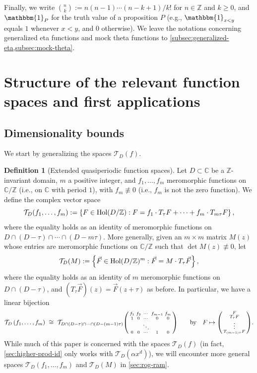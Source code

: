 \documentclass[reqno,11pt]{amsart}
\theoremstyle{definition}
\newtheorem{definition}[theorem]{Definition}
\theoremstyle{remark}
\numberwithin{equation}{section}
\newcommand{\Z}{\mathbb{Z}}
\newcommand{\C}{\mathbb{C}}
\newcommand{\mT}{\mathcal{T}}
\newcommand{\one}{\mathbbm{1}}
\newcommand{\Hol}{\textnormal{Hol}}
\newenvironment{psmall}
  {\left(\begin{smallmatrix}}
  {\end{smallmatrix}\right)}
\begin{document}
Finally, we write $\binom{n}{k} := n(n-1)\cdots(n-k+1)/k!$ for $n \in \Z$ and $k \ge 0$, and $\one_{P}$ for the truth value of a proposition $P$ (e.g., $\one_{x < y}$ equals $1$ whenever $x < y$, and $0$ otherwise). We leave the notations concerning generalized eta functions and mock theta functions to \cref{subsec:generalized-eta,subsec:mock-theta}.





\section{Structure of the relevant function spaces and first applications} \label{sec:preliminaries}

\subsection{Dimensionality bounds} \label{subsec:dim-bounds}
We start by generalizing the spaces $\mT_D(f)$.

\begin{definition}[Extended quasiperiodic function spaces] \label{def:T-spaces}
Let $D \subset \C$ be a $\Z$-invariant domain, $m$ a positive integer, and $f_1, \ldots, f_m$ meromorphic functions on $\C/\Z$ (i.e., on $\C$ with period $1$), with $f_m \not\equiv 0$ (i.e., $f_m$ is not the zero function). We define the complex vector space
\[
    \mT_D(f_1, \ldots, f_m) := \left\{F \in \Hol(D/\Z) : F = f_1 \cdot T_\tau F + \cdots + f_m \cdot T_{m\tau} F \right\},
\] 
where the equality holds as an identity of meromorphic functions on $D \cap (D - \tau) \cap \cdots \cap (D - m\tau)$. More generally, given an $m \times m$ matrix $M(z)$ whose entries are meromorphic functions on $\C/\Z$ such that $\det M(z) \not\equiv 0$, let
\[
    \mT_D(M) := 
    \left\{ 
    \vec{F} \in \Hol(D/\Z)^m
    :
    \vec{F} = M \cdot T_\tau \vec{F}
    \right\},
\]
where the equality holds as an identity of $m$ meromorphic functions on $D \cap (D - \tau)$, and $(T_\tau \vec{F})(z) = \vec{F}(z+\tau)$ as before. In particular, we have a linear bijection
\[
    \mT_D\left(f_1, \ldots, f_m\right) 
    \ 
    \cong
    \
    \mT_{D \cap (D - \tau) \cap \cdots \cap (D - (m-1)\tau)}
    \begin{psmall}
    f_1 & f_2 & \cdots & f_{m-1} & f_m
    \\
    1 & 0 & \cdots & 0 & 0 
    \\
     &  & \ddots &  &   
    \\
    0 & 0 & \cdots & 1 & 0
    \end{psmall}
    \qquad 
    \text{by} \quad
    F \mapsto 
    \begin{psmall}
    F \\
    T_\tau F \\
    \vdots \\
    T_{(m-1)\tau} F
    \end{psmall}.
\]
While much of this paper is concerned with the spaces $\mT_D(f)$ (in fact, \cref{sec:higher-prod-id} only works with $\mT_D\left(\alpha x^d\right)$), we will encounter more general spaces $\mT_D(f_1, \ldots, f_m)$ and $\mT_D(M)$ in \cref{sec:rog-ram}.
\end{definition}
\end{document}
